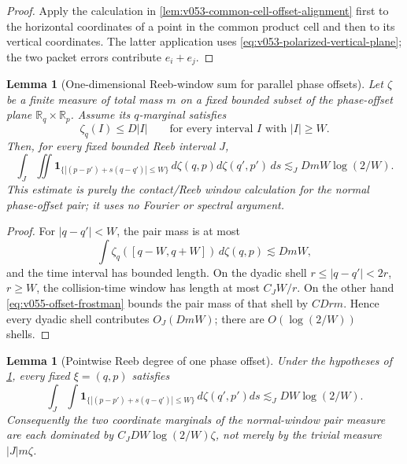 \documentclass[10pt]{article}
\newtheorem{lemma}[theorem]{Lemma}
\begin{document}
\begin{proof}
Apply the calculation in \cref{lem:v053-common-cell-offset-alignment} first to the horizontal
coordinates of a point in the common product cell and then to its vertical coordinates.  The latter
application uses \eqref{eq:v053-polarized-vertical-plane}; the two packet errors contribute
\(e_i+e_j\).
\end{proof}

\begin{lemma}[One-dimensional Reeb-window sum for parallel phase offsets]
\label{lem:v055-parallel-offset-window-sum}
Let \(\zeta\) be a finite measure of total mass \(m\) on a fixed bounded subset of the phase-offset
plane \(\mathbb R_q\times\mathbb R_p\).  Assume its \(q\)-marginal satisfies
\begin{equation}
\label{eq:v055-offset-frostman}
\zeta_q(I)
\le
D|I|
\qquad
\text{for every interval \(I\) with \(|I|\ge W\)}.
\end{equation}
Then, for every fixed bounded Reeb interval \(J\),
\begin{equation}
\label{eq:v055-parallel-offset-window-bound}
\boxed{
\int_J
\iint
\mathbf 1_{\{|(p-p')+s(q-q')|\le W\}}
\,d\zeta(q,p)d\zeta(q',p')\,ds
\lesssim_J
DmW\log(2/W).
}
\end{equation}
This estimate is purely the contact/Reeb window calculation for the normal phase-offset pair; it
uses no Fourier or spectral argument.
\end{lemma}

\begin{proof}
For \(|q-q'|<W\), the pair mass is at most
\[
\int \zeta_q([q-W,q+W])\,d\zeta(q,p)
\lesssim
DmW,
\]
and the time interval has bounded length.  On the dyadic shell
\(r\le|q-q'|<2r\), \(r\ge W\), the collision-time window has length at most \(C_JW/r\).  On the other
hand \eqref{eq:v055-offset-frostman} bounds the pair mass of that shell by \(CDrm\).  Hence every
dyadic shell contributes \(O_J(DmW)\); there are \(O(\log(2/W))\) shells.
\end{proof}

\begin{lemma}[Pointwise Reeb degree of one phase offset]
\label{lem:v056-pointwise-offset-degree}
Under the hypotheses of \cref{lem:v055-parallel-offset-window-sum}, every fixed
\(\xi=(q,p)\) satisfies
\begin{equation}
\label{eq:v056-pointwise-offset-degree}
\boxed{
\int_J\int
\mathbf 1_{\{|(p-p')+s(q-q')|\le W\}}
\,d\zeta(q',p')ds
\lesssim_J
DW\log(2/W).
}
\end{equation}
Consequently the two coordinate marginals of the normal-window pair measure are each dominated by
\(C_JDW\log(2/W)\zeta\), not merely by the trivial measure \(|J|m\zeta\).
\end{lemma}
\end{document}
